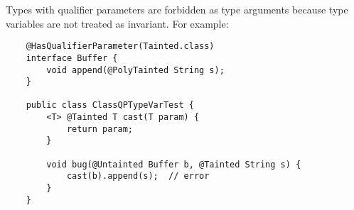 Types with qualifier parameters are forbidden as type arguments because type variables are not treated
as invariant. For example:

\begin{Verbatim}
    @HasQualifierParameter(Tainted.class)
    interface Buffer {
        void append(@PolyTainted String s);
    }

    public class ClassQPTypeVarTest {
        <T> @Tainted T cast(T param) {
            return param;
        }

        void bug(@Untainted Buffer b, @Tainted String s) {
            cast(b).append(s);  // error
        }
    }


\end{Verbatim}

